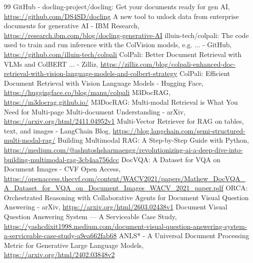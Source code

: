 ﻿\documentclass[UTF8, heading=true]{ctexart}
\begin{document}
\renewcommand\refname{引用的著作}
\begin{thebibliography}{99}
     GitHub - docling-project/docling: Get your documents ready for gen AI, \url{https://github.com/DS4SD/docling}
     A new tool to unlock data from enterprise documents for generative AI - IBM Research, \url{https://research.ibm.com/blog/docling-generative-AI}
     illuin-tech/colpali: The code used to train and run inference with the ColVision models, e.g. ... - GitHub, \url{https://github.com/illuin-tech/colpali}
     ColPali: Better Document Retrieval with VLMs and ColBERT ... - Zilliz, \url{https://zilliz.com/blog/colpali-enhanced-doc-retrieval-with-vision-language-models-and-colbert-strategy}
     ColPali: Efficient Document Retrieval with Vision Language Models - Hugging Face, \url{https://huggingface.co/blog/manu/colpali}
     M3DocRAG, \url{https://m3docrag.github.io/}
     M3DocRAG: Multi-modal Retrieval is What You Need for Multi-page Multi-document Understanding - arXiv, \url{https://arxiv.org/html/2411.04952v1}
     Multi-Vector Retriever for RAG on tables, text, and images - LangChain Blog, \url{https://blog.langchain.com/semi-structured-multi-modal-rag/}
     Building Multimodal RAG: A Step-by-Step Guide with Python, \url{https://medium.com/@ashutoshsharmaengg/revolutionizing-ai-a-deep-dive-into-building-multimodal-rag-3cb4aa756dcc}
     DocVQA: A Dataset for VQA on Document Images - CVF Open Access, \url{https://openaccess.thecvf.com/content/WACV2021/papers/Mathew_DocVQA_A_Dataset_for_VQA_on_Document_Images_WACV_2021_paper.pdf}
     ORCA: Orchestrated Reasoning with Collaborative Agents for Document Visual Question Answering - arXiv, \url{https://arxiv.org/html/2603.02438v1}
     Document Visual Question Answering System --- A Serviceable Case Study, \url{https://yashcdixit1998.medium.com/document-visual-question-answering-system-a-serviceable-case-study-a9ea662fab68}
     ANLS* - A Universal Document Processing Metric for Generative Large Language Models, \url{https://arxiv.org/html/2402.03848v2}
\end{thebibliography}
\end{document}
